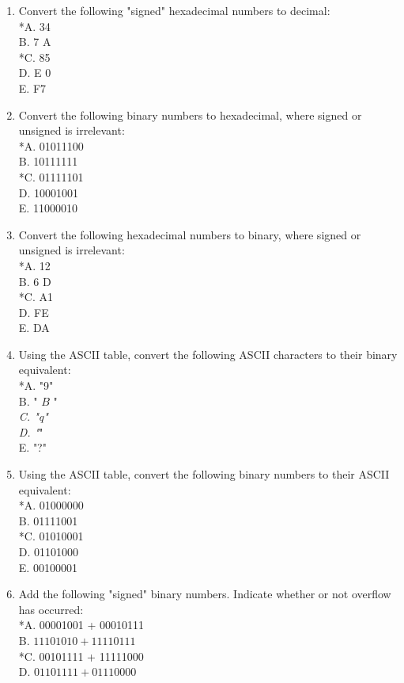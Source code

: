 \documentclass[10pt]{article}
\begin{document}
\begin{enumerate}
*A. 18\\
B. 100\\
*C. -79\\
D. -112\\
E. -247
  \item Convert the following "signed" hexadecimal numbers to decimal:\\
*A. 34\\
B. 7 A\\
*C. 85\\
D. E 0\\
E. F7
  \item Convert the following binary numbers to hexadecimal, where signed or unsigned is irrelevant:\\
*A. 01011100\\
B. 10111111\\
*C. 01111101\\
D. 10001001\\
E. 11000010
  \item Convert the following hexadecimal numbers to binary, where signed or unsigned is irrelevant:\\
*A. 12\\
B. 6 D\\
*C. A1\\
D. FE\\
E. DA
  \item Using the ASCII table, convert the following ASCII characters to their binary equivalent:\\
*A. "9"\\
B. " $B$ "\\
\textit{C. "q"\\
D. "}"\\
E. "?"
  \item Using the ASCII table, convert the following binary numbers to their ASCII equivalent:\\
*A. 01000000\\
B. 01111001\\
*C. 01010001\\
D. 01101000\\
E. 00100001
  \item Add the following "signed" binary numbers. Indicate whether or not overflow has occurred:\\
*A. 00001001 + 00010111\\
B. $11101010+11110111$\\
*C. 00101111 + 11111000\\
D. $01101111+01110000$\\

\end{enumerate}
\end{document}
